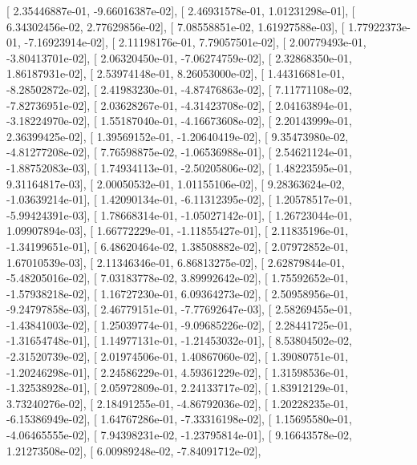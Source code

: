 \documentclass{article}
\begin{document}
       [  2.35446887e-01,  -9.66016387e-02],
       [  2.46931578e-01,   1.01231298e-01],
       [  6.34302456e-02,   2.77629856e-02],
       [  7.08558851e-02,   1.61927588e-03],
       [  1.77922373e-01,  -7.16923914e-02],
       [  2.11198176e-01,   7.79057501e-02],
       [  2.00779493e-01,  -3.80413701e-02],
       [  2.06320450e-01,  -7.06274759e-02],
       [  2.32868350e-01,   1.86187931e-02],
       [  2.53974148e-01,   8.26053000e-02],
       [  1.44316681e-01,  -8.28502872e-02],
       [  2.41983230e-01,  -4.87476863e-02],
       [  7.11771108e-02,  -7.82736951e-02],
       [  2.03628267e-01,  -4.31423708e-02],
       [  2.04163894e-01,  -3.18224970e-02],
       [  1.55187040e-01,  -4.16673608e-02],
       [  2.20143999e-01,   2.36399425e-02],
       [  1.39569152e-01,  -1.20640419e-02],
       [  9.35473980e-02,  -4.81277208e-02],
       [  7.76598875e-02,  -1.06536988e-01],
       [  2.54621124e-01,  -1.88752083e-03],
       [  1.74934113e-01,  -2.50205806e-02],
       [  1.48223595e-01,   9.31164817e-03],
       [  2.00050532e-01,   1.01155106e-02],
       [  9.28363624e-02,  -1.03639214e-01],
       [  1.42090134e-01,  -6.11312395e-02],
       [  1.20578517e-01,  -5.99424391e-03],
       [  1.78668314e-01,  -1.05027142e-01],
       [  1.26723044e-01,   1.09907894e-03],
       [  1.66772229e-01,  -1.11855427e-01],
       [  2.11835196e-01,  -1.34199651e-01],
       [  6.48620464e-02,   1.38508882e-02],
       [  2.07972852e-01,   1.67010539e-03],
       [  2.11346346e-01,   6.86813275e-02],
       [  2.62879844e-01,  -5.48205016e-02],
       [  7.03183778e-02,   3.89992642e-02],
       [  1.75592652e-01,  -1.57938218e-02],
       [  1.16727230e-01,   6.09364273e-02],
       [  2.50958956e-01,  -9.24797858e-03],
       [  2.46779151e-01,  -7.77692647e-03],
       [  2.58269455e-01,  -1.43841003e-02],
       [  1.25039774e-01,  -9.09685226e-02],
       [  2.28441725e-01,  -1.31654748e-01],
       [  1.14977131e-01,  -1.21453032e-01],
       [  8.53804502e-02,  -2.31520739e-02],
       [  2.01974506e-01,   1.40867060e-02],
       [  1.39080751e-01,  -1.20246298e-01],
       [  2.24586229e-01,   4.59361229e-02],
       [  1.31598536e-01,  -1.32538928e-01],
       [  2.05972809e-01,   2.24133717e-02],
       [  1.83912129e-01,   3.73240276e-02],
       [  2.18491255e-01,  -4.86792036e-02],
       [  1.20228235e-01,  -6.15386949e-02],
       [  1.64767286e-01,  -7.33316198e-02],
       [  1.15695580e-01,  -4.06465555e-02],
       [  7.94398231e-02,  -1.23795814e-01],
       [  9.16643578e-02,   1.21273508e-02],
       [  6.00989248e-02,  -7.84091712e-02],
\end{document}
